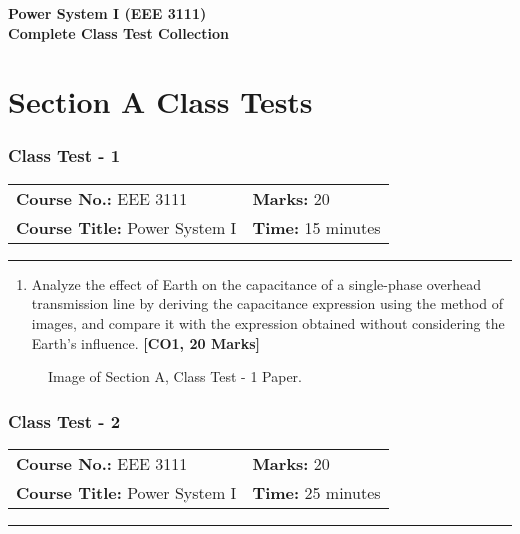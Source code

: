 \documentclass[12pt, a4paper]{article}
\begin{document}
	
	\begin{center}
		\huge \textbf{Power System I (EEE 3111) \\ Complete Class Test Collection}
	\end{center}
	\tableofcontents
	\newpage
	
	\part{Section A Class Tests}
	
	\section{Class Test - 1}
	\begin{tabular}{ll}
		\textbf{Course No.:} EEE 3111 & \textbf{Marks:} 20 \\
		\textbf{Course Title:} Power System I & \textbf{Time:} 15 minutes \\
	\end{tabular}
	\hrule
	\vspace{0.5cm}
	
	\begin{enumerate}[label=\textbf{\arabic*.}]
		\item Analyze the effect of Earth on the capacitance of a single-phase overhead transmission line by deriving the capacitance expression using the method of images, and compare it with the expression obtained without considering the Earth's influence. \hfill \textbf{[CO1, 20 Marks]}
	\end{enumerate}
	
	\begin{figure}[h!]
		\centering
		\caption{Image of Section A, Class Test - 1 Paper.}
	\end{figure}
	
	\newpage
	
	\section{Class Test - 2}
	\begin{tabular}{ll}
		\textbf{Course No.:} EEE 3111 & \textbf{Marks:} 20 \\
		\textbf{Course Title:} Power System I & \textbf{Time:} 25 minutes \\
	\end{tabular}
	\hrule
	\vspace{0.5cm}
	
\end{document}
